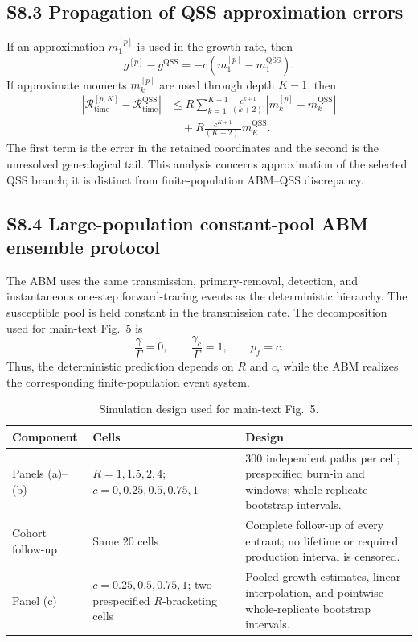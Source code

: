 \documentclass[9pt,a4paper]{article}
\begin{document}
\subsection*{S8.3 Propagation of QSS approximation errors}

If an approximation $m_1^{[p]}$ is used in the growth rate, then
\begin{equation}
g^{[p]}-g^{\mathrm{QSS}}
=-c\left(m_1^{[p]}-m_1^{\mathrm{QSS}}\right).
\label{eq:S8-growth-error}
\end{equation}
If approximate moments $m_k^{[p]}$ are used through depth $K-1$, then
\begin{align}
\left|
\mathcal R_{\mathrm{time}}^{[p,K]}
-
\mathcal R_{\mathrm{time}}^{\mathrm{QSS}}
\right|
&\leq
R\sum_{k=1}^{K-1}
\frac{c^{k+1}}{(k+2)!}
\left|m_k^{[p]}-m_k^{\mathrm{QSS}}\right| \\
&\quad+
R\frac{c^{K+1}}{(K+2)!}m_K^{\mathrm{QSS}}.
\label{eq:S8-Rtime-error}
\end{align}
The first term is the error in the retained coordinates and the second is the unresolved genealogical tail. This analysis concerns approximation of the selected QSS branch; it is distinct from finite-population ABM--QSS discrepancy.

\subsection*{S8.4 Large-population constant-pool ABM ensemble protocol}

The ABM uses the same transmission, primary-removal, detection, and instantaneous one-step forward-tracing events as the deterministic hierarchy. The susceptible pool is held constant in the transmission rate. The decomposition used for main-text Fig.~5 is
\begin{equation}
\frac{\gamma}{\Gamma}=0,
\qquad
\frac{\gamma_c}{\Gamma}=1,
\qquad
p_f=c.
\label{eq:S8-abm-decomposition}
\end{equation}
Thus, the deterministic prediction depends on $R$ and $c$, while the ABM realizes the corresponding finite-population event system.

\begin{table}[H]
\centering
\caption{Simulation design used for main-text Fig.~5.}
\label{tab:S8-simulation-design}
\scriptsize
\begin{tabular}{p{}p{}p{}}
\toprule
Component & Cells & Design \\
\midrule
Panels (a)--(b) & $R=1,1.5,2,4$; $c=0,0.25,0.5,0.75,1$ & 300 independent paths per cell; prespecified burn-in and windows; whole-replicate bootstrap intervals. \\
Cohort follow-up & Same 20 cells & Complete follow-up of every entrant; no lifetime or required production interval is censored. \\
Panel (c) & $c=0.25,0.5,0.75,1$; two prespecified $R$-bracketing cells & Pooled growth estimates, linear interpolation, and pointwise whole-replicate bootstrap intervals. \\
\bottomrule
\end{tabular}
\end{table}
\end{document}
